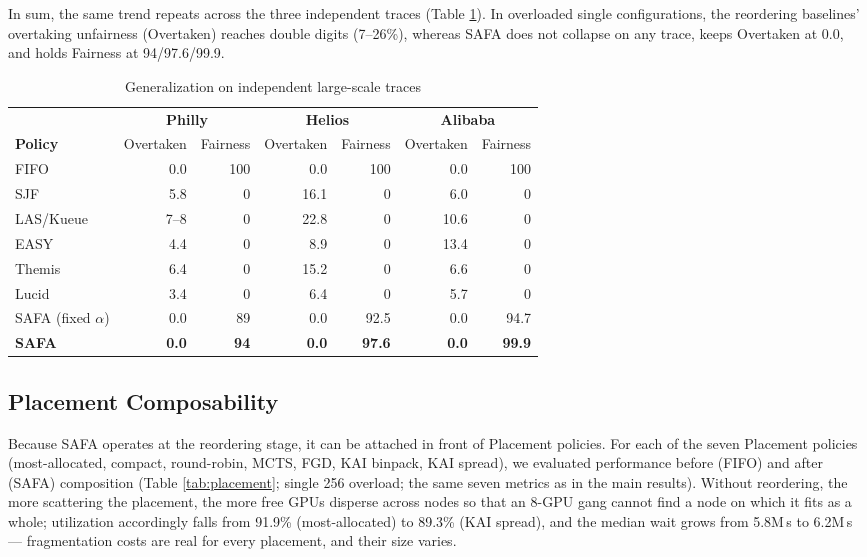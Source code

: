 \documentclass{ieeetj}
\begin{document}
In sum, the same trend repeats across the three independent traces (Table \ref{tab:trace3}). In overloaded single configurations, the reordering baselines' overtaking unfairness (Overtaken) reaches double digits (7--26\%), whereas SAFA does not collapse on any trace, keeps Overtaken at 0.0, and holds Fairness at 94/97.6/99.9.

\begin{table}[htb!]
\centering
\caption{Generalization on independent large-scale traces}
\label{tab:trace3}
\scriptsize
\setlength{\tabcolsep}{4pt}
\begin{tabular}{@{}l@{\hspace{0.6em}}rr@{\hspace{0.9em}}rr@{\hspace{0.9em}}rr@{}}
\toprule
 & \multicolumn{2}{c}{\textbf{Philly}} & \multicolumn{2}{c}{\textbf{Helios}} & \multicolumn{2}{c}{\textbf{Alibaba}} \\
\cmidrule(lr){2-3}\cmidrule(lr){4-5}\cmidrule(lr){6-7}
\textbf{Policy} & Overtaken & Fairness & Overtaken & Fairness & Overtaken & Fairness \\
\midrule
FIFO          & 0.0   & 100  & 0.0  & 100  & 0.0  & 100 \\
SJF           & 5.8   & 0    & 16.1 & 0    & 6.0  & 0 \\
LAS/Kueue     & 7--8  & 0    & 22.8 & 0    & 10.6 & 0 \\
EASY          & 4.4   & 0    & 8.9  & 0    & 13.4 & 0 \\
Themis        & 6.4   & 0    & 15.2 & 0    & 6.6  & 0 \\
Lucid         & 3.4   & 0    & 6.4  & 0    & 5.7  & 0 \\
SAFA (fixed $\alpha$) & 0.0 & 89 & 0.0 & 92.5 & 0.0 & 94.7 \\
\textbf{SAFA} & \textbf{0.0} & \textbf{94} & \textbf{0.0} & \textbf{97.6} & \textbf{0.0} & \textbf{99.9} \\
\bottomrule
\end{tabular}
\end{table}

\subsection{Placement Composability}\label{eval:robust:placement}
Because SAFA operates at the reordering stage, it can be attached in front of Placement policies. For each of the seven Placement policies (most-allocated, compact, round-robin, MCTS, FGD, KAI binpack, KAI spread), we evaluated performance before (FIFO) and after (SAFA) composition (Table \ref{tab:placement}; single 256 overload; the same seven metrics as in the main results). Without reordering, the more scattering the placement, the more free GPUs disperse across nodes so that an 8-GPU gang cannot find a node on which it fits as a whole; utilization accordingly falls from 91.9\% (most-allocated) to 89.3\% (KAI spread), and the median wait grows from 5.8M\,s to 6.2M\,s --- fragmentation costs are real for every placement, and their size varies.
\end{document}
